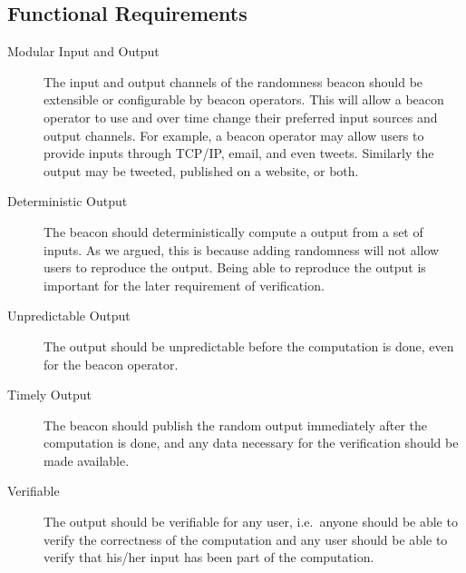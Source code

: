 \subsection{Functional Requirements}
\label{sub:functional_requirements}
\begin{description}
    \item[Modular Input and Output] The input and output channels of the randomness beacon should be extensible or configurable by beacon operators. This will allow a beacon operator to use and over time change their preferred input sources and output channels. For example, a beacon operator may allow users to provide inputs through TCP/IP, email, and even tweets. Similarly the output may be tweeted, published on a website, or both.

    \item[Deterministic Output] The beacon should deterministically compute a output from a set of inputs. As we argued, this is because adding randomness will not allow users to reproduce the output. Being able to reproduce the output is important for the later requirement of verification. %

    \item[Unpredictable Output] The output should be unpredictable before the computation is done, even for the beacon operator.


    \item[Timely Output] The beacon should publish the random output immediately after the computation is done, and any data necessary for the verification should be made available.

    \item[Verifiable] The output should be verifiable for any user, i.e.\ anyone should be able to verify the correctness of the computation and any user should be able to verify that his/her input has been part of the computation.
\end{description}

